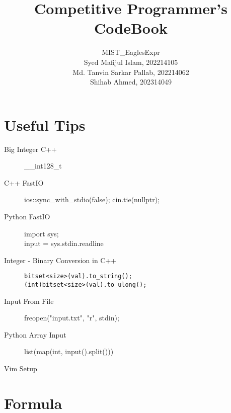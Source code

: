 \documentclass[10pt, a4paper]{article}
\title{Competitive Programmer’s CodeBook}
\author{MIST\_EaglesExpr\\[2cm] Syed Mafijul Islam, 202214105\\
Md. Tanvin Sarkar Pallab, 202214062\\
Shihab Ahmed, 202314049
}
\begin{document}
\maketitle
\thispagestyle{empty}

\newpage
\tableofcontents
\newpage

\begin{multicols}{2}

\section{Useful Tips}
\begin{description}
    \item[Big Integer C++] \_\_int128\_t
    \item[C++ FastIO] \hfill \break
    ios::sync\_with\_stdio(false);
    cin.tie(nullptr);
    \item[Python FastIO] \hfill \break
    import sys; \\
    input = sys.stdin.readline
    \item[Integer - Binary Conversion in C++] \hfill
    \begin{lstlisting}
bitset<size>(val).to_string();
(int)bitset<size>(val).to_ulong();
    \end{lstlisting}
    \item[Input From File] \hfill \break
    freopen("input.txt", "r", stdin);
    \item[Python Array Input] \hfill \break
    list(map(int, input().split()))
    \item [Vim Setup] \hfill
    
\end{description}

\section{Formula}

\end{multicols}
\end{document}
